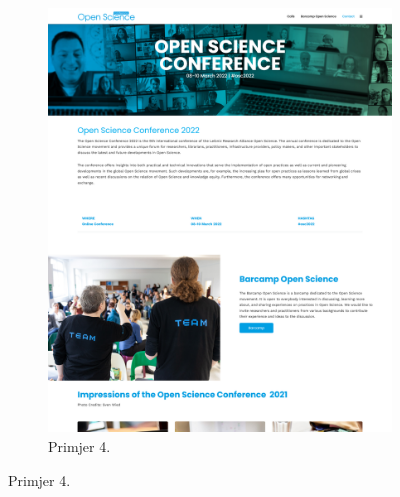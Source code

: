 \begin{figure}[H]
\begin{subfigure}{0.4\linewidth}
				\includegraphics[width=\linewidth]{slike/frontpage_example4}
				\caption{Primjer 4.}
				\label{frontpage_example4}
			\end{subfigure}
		\end{figure}
	
